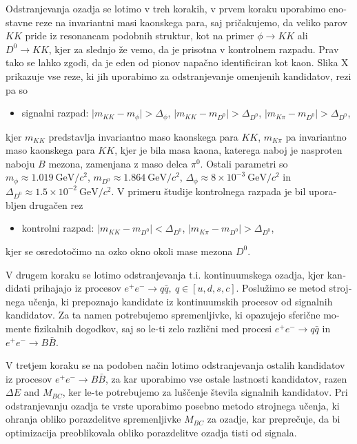 \documentclass[headings=standardclasses,headings=big,oneside,a4paper,openany,12pt]{scrbook}
\newcommand {\e}[1]{\mathrm{~#1}}
\newcommand {\E}[1]{\times 10^{#1}}
\newcommand {\vars}{$\Delta E$ and $M_{BC}$}
\begin{document}
\begin{otherlanguage}{slovene}
Odstranjevanja ozadja se lotimo v treh korakih, v prvem koraku uporabimo enostavne reze na invariantni masi kaonskega para, saj pričakujemo, da veliko parov $KK$ pride iz resonancam podobnih struktur, kot na primer $\phi \to KK$ ali $D^0 \to KK$, kjer za slednjo že vemo, da je prisotna v kontrolnem razpadu. Prav tako se lahko zgodi, da je eden od pionov napačno identificiran kot kaon. Slika X prikazuje vse reze, ki jih uporabimo za odstranjevanje omenjenih kandidatov, rezi pa so
\begin{itemize}
\item signalni razpad: $\vert m_{KK} - m_{\phi} \vert > \Delta_\phi$, $\vert m_{KK} - m_{D^0} \vert > \Delta_{D^0}$, $\vert m_{K\pi} - m_{D^0} \vert > \Delta_{D^0}$,
\end{itemize}
kjer $m_{KK}$ predstavlja invariantno maso kaonskega para $KK$, $m_{K\pi}$ pa invariantno maso kaonskega para $KK$, kjer je bila masa kaona, katerega naboj je nasproten naboju $B$ mezona, zamenjana z maso delca $\pi^0$. Ostali parametri so $m_\phi \approx 1.019\e{GeV}/c^2$, $m_{D^0} \approx 1.864\e{GeV}/c^2$, $\Delta_\phi \approx 8\E{-3}\e{GeV}/c^2$ in $\Delta_{D^0} \approx 1.5\E{-2}\e{GeV}/c^2$. V primeru študije kontrolnega razpada je bil uporabljen drugačen rez
\begin{itemize}
\item kontrolni razpad: $\vert m_{KK} - m_{D^0} \vert < \Delta_{D^0}$, $\vert m_{K\pi} - m_{D^0} \vert > \Delta_{D^0}$,
\end{itemize}
kjer se osredotočimo na ozko okno okoli mase mezona $D^0$. 

V drugem koraku se lotimo odstranjevanja t.i. kontinuumskega ozadja, kjer kandidati prihajajo iz procesov $e^+e^- \to q \bar q,~q\in[u,d,s,c]$. Poslužimo se metod strojnega učenja, ki prepoznajo kandidate iz kontinuumskih procesov od signalnih kandidatov. Za ta namen potrebujemo spremenljivke, ki opazujejo sferične momente fizikalnih dogodkov, saj so le-ti zelo različni med procesi $e^+e^- \to q \bar q$ in $e^+e^- \to B \bar B$.

V tretjem koraku se na podoben način lotimo odstranjevanja ostalih kandidatov iz procesov $e^+e^- \to B \bar B$, za kar uporabimo vse ostale lastnosti kandidatov, razen \vars, ker le-te potrebujemo za luščenje števila signalnih kandidatov. Pri odstranjevanju ozadja te vrste uporabimo posebno metodo strojnega učenja, ki ohranja obliko porazdelitve spremenljivke $M_{BC}$ za ozadje, kar preprečuje, da bi optimizacija preoblikovala obliko porazdelitve ozadja tisti od signala.


\end{otherlanguage}
\end{document}
